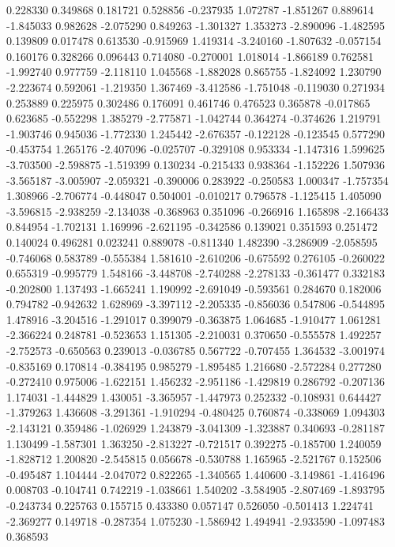 0.228330
0.349868
0.181721
0.528856
-0.237935
1.072787
-1.851267
0.889614
-1.845033
0.982628
-2.075290
0.849263
-1.301327
1.353273
-2.890096
-1.482595
0.139809
0.017478
0.613530
-0.915969
1.419314
-3.240160
-1.807632
-0.057154
0.160176
0.328266
0.096443
0.714080
-0.270001
1.018014
-1.866189
0.762581
-1.992740
0.977759
-2.118110
1.045568
-1.882028
0.865755
-1.824092
1.230790
-2.223674
0.592061
-1.219350
1.367469
-3.412586
-1.751048
-0.119030
0.271934
0.253889
0.225975
0.302486
0.176091
0.461746
0.476523
0.365878
-0.017865
0.623685
-0.552298
1.385279
-2.775871
-1.042744
0.364274
-0.374626
1.219791
-1.903746
0.945036
-1.772330
1.245442
-2.676357
-0.122128
-0.123545
0.577290
-0.453754
1.265176
-2.407096
-0.025707
-0.329108
0.953334
-1.147316
1.599625
-3.703500
-2.598875
-1.519399
0.130234
-0.215433
0.938364
-1.152226
1.507936
-3.565187
-3.005907
-2.059321
-0.390006
0.283922
-0.250583
1.000347
-1.757354
1.308966
-2.706774
-0.448047
0.504001
-0.010217
0.796578
-1.125415
1.405090
-3.596815
-2.938259
-2.134038
-0.368963
0.351096
-0.266916
1.165898
-2.166433
0.844954
-1.702131
1.169996
-2.621195
-0.342586
0.139021
0.351593
0.251472
0.140024
0.496281
0.023241
0.889078
-0.811340
1.482390
-3.286909
-2.058595
-0.746068
0.583789
-0.555384
1.581610
-2.610206
-0.675592
0.276105
-0.260022
0.655319
-0.995779
1.548166
-3.448708
-2.740288
-2.278133
-0.361477
0.332183
-0.202800
1.137493
-1.665241
1.190992
-2.691049
-0.593561
0.284670
0.182006
0.794782
-0.942632
1.628969
-3.397112
-2.205335
-0.856036
0.547806
-0.544895
1.478916
-3.204516
-1.291017
0.399079
-0.363875
1.064685
-1.910477
1.061281
-2.366224
0.248781
-0.523653
1.151305
-2.210031
0.370650
-0.555578
1.492257
-2.752573
-0.650563
0.239013
-0.036785
0.567722
-0.707455
1.364532
-3.001974
-0.835169
0.170814
-0.384195
0.985279
-1.895485
1.216680
-2.572284
0.277280
-0.272410
0.975006
-1.622151
1.456232
-2.951186
-1.429819
0.286792
-0.207136
1.174031
-1.444829
1.430051
-3.365957
-1.447973
0.252332
-0.108931
0.644427
-1.379263
1.436608
-3.291361
-1.910294
-0.480425
0.760874
-0.338069
1.094303
-2.143121
0.359486
-1.026929
1.243879
-3.041309
-1.323887
0.340693
-0.281187
1.130499
-1.587301
1.363250
-2.813227
-0.721517
0.392275
-0.185700
1.240059
-1.828712
1.200820
-2.545815
0.056678
-0.530788
1.165965
-2.521767
0.152506
-0.495487
1.104444
-2.047072
0.822265
-1.340565
1.440600
-3.149861
-1.416496
0.008703
-0.104741
0.742219
-1.038661
1.540202
-3.584905
-2.807469
-1.893795
-0.243734
0.225763
0.155715
0.433380
0.057147
0.526050
-0.501413
1.224741
-2.369277
0.149718
-0.287354
1.075230
-1.586942
1.494941
-2.933590
-1.097483
0.368593
